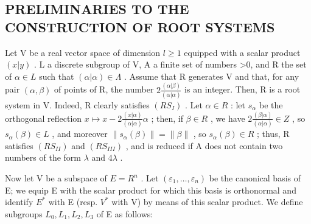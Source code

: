 \subsection{PRELIMINARIES TO THE CONSTRUCTION OF ROOT SYSTEMS}

Let V be a real vector space of dimension \(l \geqslant 1\) equipped with a scalar product \((x|y)\) . L a discrete subgroup of V, A a finite set of numbers \textgreater0, and R the set of \(\alpha \in L\) such that \((\alpha|\alpha) \in \Lambda\) . Assume that R generates V and that, for any pair \((\alpha,\beta)\) of points of R, the number \(2\frac{(\alpha|\beta)}{(\alpha|\alpha)}\) is an integer. Then, R is a root system in V. Indeed, R clearly satisfies \((RS_{I})\) . Let \(\alpha \in R\) : let \(s_{\alpha}\) be the orthogonal reflection \(x \mapsto x - 2\frac{(x|\alpha)}{(\alpha|\alpha)}\alpha\) ; then, if \(\beta \in R\) , we have \(2\frac{(\beta|\alpha)}{(\alpha|\alpha)} \in Z\) , so \(s_{\alpha}(\beta) \in L\) , and moreover \(\|s_{\alpha}(\beta)\| = \| \beta \|\) , so \(s_{\alpha}(\beta) \in R\) ; thus, R satisfies \((RS_{II})\) and \((RS_{III})\) , and is reduced if A does not contain two numbers of the form \(\lambda\) and \(4\lambda\) .

Now let V be a subspace of \(E = R^{n}\) . Let \((\varepsilon_{1}, \ldots, \varepsilon_{n})\) be the canonical basis of E; we equip E with the scalar product for which this basis is orthonormal and identify \(E^{*}\) with E (resp. \(V^{*}\) with V) by means of this scalar product. We define subgroups \(L_{0}, L_{1}, L_{2}, L_{3}\) of E as follows:

